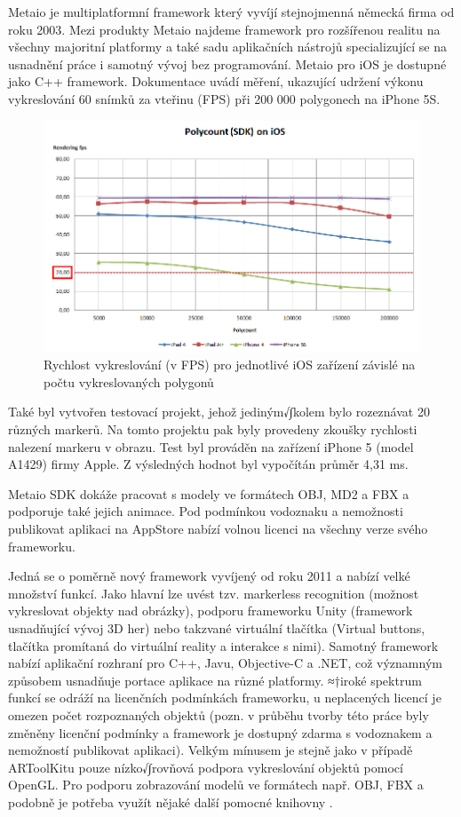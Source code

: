 \documentclass[twoside,12pt]{article}
\begin{document}
Metaio je multiplatformní framework který vyvíjí stejnojmenná německá firma od roku 2003. Mezi produkty Metaio najdeme framework pro rozšířenou realitu na všechny majoritní platformy a také sadu aplikačních nástrojů specializující se na usnadnění práce i samotný vývoj bez programování. Metaio pro iOS je dostupné jako C++ framework. 
Dokumentace uvádí měření, ukazující udržení výkonu vykreslování 60 snímků za vteřinu (FPS) při 200 000 polygonech na iPhone 5S.

\begin{figure}[H]
\centering
    \includegraphics[width=424px, center]{images/Polycount_SDK_iOS_20fps.png}
\captionsetup{justification=centering}
    \caption{Rychlost vykreslování (v FPS) pro jednotlivé iOS zařízení závislé na počtu vykreslovaných polygonů}
    \label{metaio_benchmark}
\end{figure}

Také byl vytvořen testovací projekt, jehož jediným√∫kolem bylo rozeznávat 20 různých markerů. Na tomto projektu pak byly provedeny zkoušky rychlosti nalezení markeru v obrazu. Test byl prováděn na zařízení iPhone 5 (model A1429) firmy Apple. Z výsledných hodnot byl vypočítán průměr 4,31 ms. 


Metaio SDK dokáže pracovat s modely ve formátech OBJ, MD2 a FBX a podporuje také jejich animace. Pod podmínkou vodoznaku a nemožnosti publikovat aplikaci na AppStore nabízí volnou licenci na všechny verze svého frameworku. 

Jedná se o poměrně nový framework vyvíjený od roku 2011 a nabízí velké množství funkcí. Jako hlavní lze uvést tzv. markerless recognition (možnost vykreslovat objekty nad obrázky), podporu frameworku Unity (framework usnadňující vývoj 3D her) nebo takzvané virtuální tlačítka (Virtual buttons, tlačítka promítaná do virtuální reality a interakce s nimi). Samotný framework nabízí aplikační rozhraní pro C++, Javu, Objective-C a .NET, což významným způsobem usnadňuje portace aplikace na různé platformy. ≈†iroké spektrum funkcí se odráží na licenčních podmínkách frameworku, u neplacených licencí je omezen počet rozpoznaných objektů (pozn. v průběhu tvorby této práce byly změněny licenční podmínky a framework je dostupný zdarma s vodoznakem a nemožností publikovat aplikaci). Velkým mínusem je stejně jako v případě ARToolKitu pouze nízko√∫rovňová podpora vykreslování objektů pomocí OpenGL. Pro podporu zobrazování modelů ve formátech např. OBJ, FBX a podobně je potřeba využít nějaké další pomocné knihovny \cite{vuforia_3dformats}.
\end{document}
